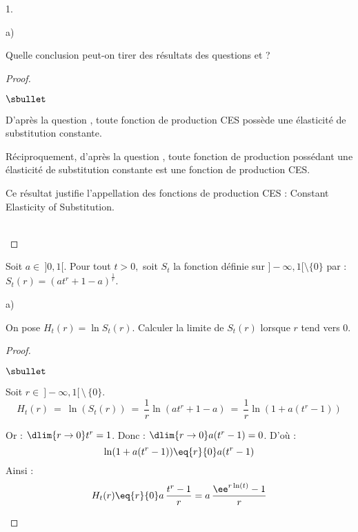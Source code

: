 \documentclass[11pt]{article}%
\begin{document}
\begin{noliste}{1.}
\begin{noliste}{a)}
  
  
  
  \newpage
  
  
  

  
  \item Quelle conclusion peut-on tirer des résultats des questions 
   et  ?
  
  \begin{proof}~
   \begin{noliste}{$\sbullet$}
    \item D'après la question , toute fonction de 
    production CES possède une élasticité de substitution constante.
    
    \item Réciproquement, d'après la question , toute
    fonction de production possédant une élasticité de 
    substitution constante est une fonction de production CES.
   \end{noliste}
   
   
   \begin{remark}
    Ce résultat justifie l'appellation des fonctions de production
    CES : Constant Elasticity of Substitution.
   \end{remark}~\\[-1.4cm]
  \end{proof}
 \end{noliste}
 
 \item Soit $a \in \ ]0,1[$. Pour tout $t>0,$ soit $S_t$ la fonction 
 définie sur $]-\infty,1[ \setminus \{0\}$ par : 
 $S_t(r)=(at^r+1-a)^{\frac{1}{r}}$.
 \begin{noliste}{a)}
  \setlength{\itemsep}{2mm}
  \item On pose $H_t(r)=\ln S_t(r)$. Calculer la limite de $S_t(r)$ 
  lorsque $r$ tend vers 0.
  
  \begin{proof}~
   \begin{noliste}{$\sbullet$}
    \item Soit $r\in \ ]-\infty,1[ \, \setminus \, \{0\}$.
    \[
     H_t(r) \ = \ \ln(S_t(r)) \ = \ \dfrac{1}{r} \ln(at^r +1-a)
     \ = \ \dfrac{1}{r} \ln(1+ a(t^r-1))
    \]
    
    \item Or : $\dlim{r\to 0} t^r=1$. Donc : 
    $\dlim{r\to 0} a(t^r-1)=0$. D'où :
    \[
     \ln(1+a(t^r-1)) \eq{r}{0} a(t^r-1)
    \]
    Ainsi :
    \[
     H_t(r) \eq{r}{0} a \, \dfrac{t^r-1}{r} = a \,
     \dfrac{\ee^{r \ln(t)}-1}{r}
    \]
    

\end{noliste}
\end{proof}
\end{noliste}
\end{noliste}
\end{document}
